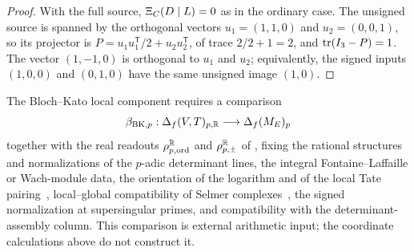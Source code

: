 \begin{proof}
With the full source, $\Xi_C(D\mid L)=0$ as in the ordinary case.  The unsigned
source is spanned by the orthogonal vectors $u_1=(1,1,0)$ and
$u_2=(0,0,1)$, so its projector is $P=u_1u_1^{\mathsf T}/2+u_2u_2^{\mathsf
T}$, of trace $2/2+1=2$, and $\operatorname{tr}(I_3-P)=1$.  The vector $(1,-1,0)$ is
orthogonal to $u_1$ and $u_2$; equivalently, the signed inputs
$(1,0,0)$ and $(0,1,0)$ have the same unsigned image $(1,0)$.
\end{proof}

\begin{obligation}\label{obl:apparatus:rho-p-transport}
The Bloch--Kato local component requires a comparison
\[
  \beta_{\mathrm{BK},p}:
  \Delta_f(V,T)_{p,\mathbb{R}}
  \longrightarrow
  \Delta_f(M_E)_p
\]
together with the real readouts $\rho_{p,\mathrm{ord}}^{\mathbb{R}}$ and
$\rho_{p,\pm}^{\mathbb{R}}$ of , fixing the
rational structures and normalizations of the $p$-adic determinant lines,
the integral Fontaine--Laffaille or Wach-module data, the
orientation of the logarithm and of the local Tate pairing~\citep{Milne1986},
local--global compatibility of Selmer complexes~\citep{Nekovar2006}, the
signed normalization at supersingular primes, and compatibility with the
determinant-assembly column.  This comparison is external arithmetic
input; the coordinate calculations above do not construct it.
\end{obligation}
